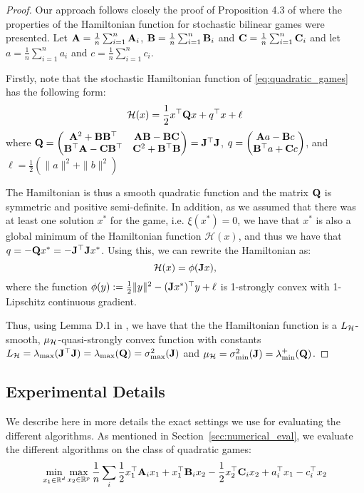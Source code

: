 \documentclass{article}
\begin{document}
\begin{proof}
  Our approach follows closely the proof of Proposition 4.3 of \cite{loizou2020stochastic} where the properties of the Hamiltonian function for stochastic bilinear games were presented. Let $\mathbf{A}=\frac{1}{n}\sum_{i=1}^n \mathbf{A}_i$, $\mathbf{B}=\frac{1}{n}\sum_{i=1}^n \mathbf{B}_i$ and $\mathbf{C}=\frac{1}{n}\sum_{i=1}^n \mathbf{C}_i$ and let $a=\frac{1}{n}\sum_{i=1}^n a_i$ and $c=\frac{1}{n}\sum_{i=1}^n c_i$.
  
Firstly, note that the stochastic Hamiltonian function of \eqref{eq:quadratic_games} has the following form:
      $$\mathcal{H}(x) = \frac{1}{2} x^\top \mathbf{Q} x + q^\top x + \ell$$
  where $\mathbf{Q} = \begin{pmatrix} \mathbf{A}^2 + \mathbf{B} \mathbf{B}^\top & \mathbf{A} \mathbf{B} - \mathbf{B}\mathbf{C} \\ \mathbf{B}^\top \mathbf{A} - \mathbf{C} \mathbf{B}^\top & \mathbf{C}^2 + \mathbf{B}^\top \mathbf{B} \end{pmatrix} = \mathbf{J}^\top \mathbf{J}$, $q = \begin{pmatrix} \mathbf{A} a - \mathbf{B} c \\ \mathbf{B}^\top a + \mathbf{C} c \end{pmatrix}$, and $\ell = \frac{1}{2} (\|a\|^2 + \|b\|^2)$
  
  The Hamiltonian is thus a smooth quadratic function and the matrix $\mathbf{Q}$ is symmetric and positive semi-definite.
  In addition, as we assumed that there was at least one solution $x^*$ for the game, i.e. $\xi(x^*)=0$, we have that $x^*$ is also a global minimum of the Hamiltonian function $\mathcal{H}(x)$, and thus we have that $q=-\mathbf{Q} x^*=-\mathbf{J}^\top \mathbf{J} x^*$.
  Using this, we can rewrite the Hamiltonian as:
  $$\mathcal{H}(x)=\phi(\mathbf{J} x),$$
where the function $\phi(y):=\frac{1}{2}\|y\|^2 - (\mathbf{J} x^*)^\top y+\ell$ is 1-strongly convex with 1-Lipschitz continuous gradient.

Thus, using Lemma D.1 in \cite{loizou2020stochastic}, we have that the the Hamiltonian function is a $L_{{\cal H}}$-smooth, $\mu_{{\cal H}}$-quasi-strongly convex function with constants $L_{{\cal H}}=\lambda_{\max}(\mathbf{J}^\top \mathbf{J})=\lambda_{\max }(\mathbf{Q})=\sigma_{\max}^2(\mathbf{J})$ and $\mu_{{\cal H}}=\sigma_{\min }^2(\mathbf{J})=\lambda_{\min }^+(\mathbf{Q})$.
\end{proof}

\subsection{Experimental Details}
\label{app:experimental_details}
We describe here in more details the exact settings we use for evaluating the different algorithms. 
As mentioned in Section~\ref{sec:numerical_eval}, we evaluate the different algorithms on the class of quadratic games:
\begin{equation*}
  \min_{x_1 \in \mathbb{R}^{d}} \max_{x_2 \in \mathbb{R}^{p}} \frac{1}{n}\sum_i \frac{1}{2} x_1^\top \mathbf{A}_i x_1 + x_1^\top \mathbf{B}_i x_2 - \frac{1}{2} x_2^\top \mathbf{C}_i x_2 + a_i^\top x_1 - c_i^\top x_2
\end{equation*}
\end{document}
